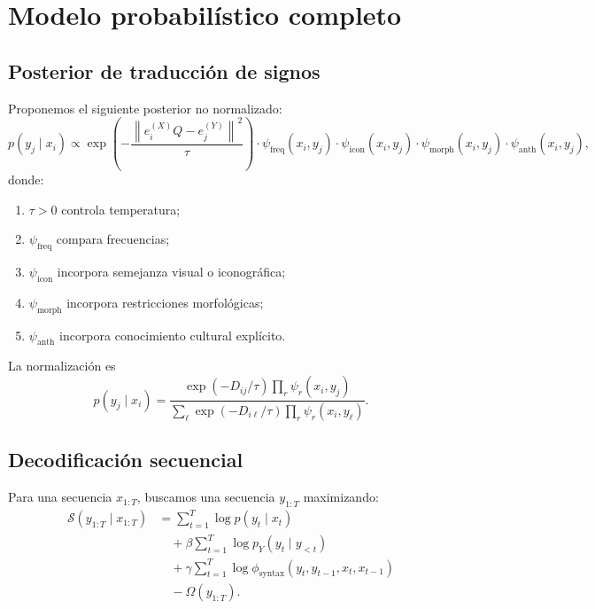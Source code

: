 \documentclass[11pt,a4paper]{article}
\newcommand{\1}{\mathbf{1}}
\newcommand{\norm}[1]{\left\lVert #1 \right\rVert}
\numberwithin{equation}{section}
\begin{document}
\section{Modelo probabilístico completo}

\subsection{Posterior de traducción de signos}

Proponemos el siguiente posterior no normalizado:
\begin{equation}
    p(y_j\mid x_i)
    \propto
    \exp\left(
    -\frac{\norm{e_i^{(X)}Q-e_j^{(Y)}}^2}{\tau}
    \right)
    \cdot
    \psi_{\mathrm{freq}}(x_i,y_j)
    \cdot
    \psi_{\mathrm{icon}}(x_i,y_j)
    \cdot
    \psi_{\mathrm{morph}}(x_i,y_j)
    \cdot
    \psi_{\mathrm{anth}}(x_i,y_j),
    \label{eq:posterior_symbol}
\end{equation}
donde:
\begin{enumerate}[label=(\roman*)]
    \item \(\tau>0\) controla temperatura;
    \item \(\psi_{\mathrm{freq}}\) compara frecuencias;
    \item \(\psi_{\mathrm{icon}}\) incorpora semejanza visual o iconográfica;
    \item \(\psi_{\mathrm{morph}}\) incorpora restricciones morfológicas;
    \item \(\psi_{\mathrm{anth}}\) incorpora conocimiento cultural explícito.
\end{enumerate}

La normalización es
\[
    p(y_j\mid x_i)
    =
    \frac{\exp(-D_{ij}/\tau)\prod_r\psi_r(x_i,y_j)}
    {\sum_{\ell}
    \exp(-D_{i\ell}/\tau)\prod_r\psi_r(x_i,y_\ell)}.
\]

\subsection{Decodificación secuencial}

Para una secuencia \(x_{1:T}\), buscamos una secuencia \(y_{1:T}\) maximizando:
\begin{align}
    \mathcal{S}(y_{1:T}\mid x_{1:T})
    &=
    \sum_{t=1}^{T}
    \log p(y_t\mid x_t)
    \nonumber\\
    &\quad+
    \beta
    \sum_{t=1}^{T}
    \log p_Y(y_t\mid y_{<t})
    \nonumber\\
    &\quad+
    \gamma
    \sum_{t=1}^{T}
    \log \phi_{\mathrm{syntax}}(y_t,y_{t-1},x_t,x_{t-1})
    \nonumber\\
    &\quad-
    \Omega(y_{1:T}).
    \label{eq:sequence_decoder}
\end{align}
\end{document}
